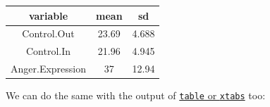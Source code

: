 \documentclass[]{article}
\newenvironment{Shaded}{\begin{snugshade}}{\end{snugshade}}
\newcommand{\KeywordTok}[1]{\textcolor[rgb]{0.13,0.29,0.53}{\textbf{#1}}}
\newcommand{\DataTypeTok}[1]{\textcolor[rgb]{0.13,0.29,0.53}{#1}}
\newcommand{\StringTok}[1]{\textcolor[rgb]{0.31,0.60,0.02}{#1}}
\newcommand{\OperatorTok}[1]{\textcolor[rgb]{0.81,0.36,0.00}{\textbf{#1}}}
\newcommand{\NormalTok}[1]{#1}
\theoremstyle{definition}
\theoremstyle{definition}
\theoremstyle{definition}
\theoremstyle{remark}
\begin{document}
\begin{longtable}[]{@{}ccc@{}}
\toprule
\begin{minipage}[b]{0.24\columnwidth}\centering\strut
variable\strut
\end{minipage} & \begin{minipage}[b]{0.10\columnwidth}\centering\strut
mean\strut
\end{minipage} & \begin{minipage}[b]{0.10\columnwidth}\centering\strut
sd\strut
\end{minipage}\tabularnewline
\midrule
\endhead
\begin{minipage}[t]{0.24\columnwidth}\centering\strut
Control.Out\strut
\end{minipage} & \begin{minipage}[t]{0.10\columnwidth}\centering\strut
23.69\strut
\end{minipage} & \begin{minipage}[t]{0.10\columnwidth}\centering\strut
4.688\strut
\end{minipage}\tabularnewline
\begin{minipage}[t]{0.24\columnwidth}\centering\strut
Control.In\strut
\end{minipage} & \begin{minipage}[t]{0.10\columnwidth}\centering\strut
21.96\strut
\end{minipage} & \begin{minipage}[t]{0.10\columnwidth}\centering\strut
4.945\strut
\end{minipage}\tabularnewline
\begin{minipage}[t]{0.24\columnwidth}\centering\strut
Anger.Expression\strut
\end{minipage} & \begin{minipage}[t]{0.10\columnwidth}\centering\strut
37\strut
\end{minipage} & \begin{minipage}[t]{0.10\columnwidth}\centering\strut
12.94\strut
\end{minipage}\tabularnewline
\bottomrule
\end{longtable}

We can do the same with the output of
\protect\hyperlink{frequency-tables}{\texttt{table} or \texttt{xtabs}}
too:

\begin{Shaded}
\end{Shaded}
\end{document}
